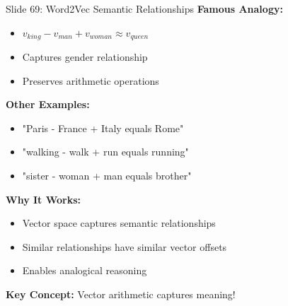 \documentclass[8pt]{beamer}
\begin{document}
	\begin{frame}{Slide 69: Word2Vec Semantic Relationships}
		\fontsize{6.5}{7.5}\selectfont
		\textbf{Famous Analogy:}
		\begin{itemize}
			\item $v_{king} - v_{man} + v_{woman} \approx v_{queen}$
			\item Captures gender relationship
			\item Preserves arithmetic operations
		\end{itemize}
		
		\vspace{0.1cm}
		\textbf{Other Examples:}
		\begin{itemize}
			\item "Paris - France + Italy equals Rome"
			\item "walking - walk + run equals running"
			\item "sister - woman + man equals brother"
		\end{itemize}
		
		\vspace{0.1cm}
		\textbf{Why It Works:}
		\begin{itemize}
			\item Vector space captures semantic relationships
			\item Similar relationships have similar vector offsets
			\item Enables analogical reasoning
		\end{itemize}
		
		\textcolor{myblue}{\textbf{Key Concept:}} Vector arithmetic captures meaning!
	\end{frame}
	
\end{document}
